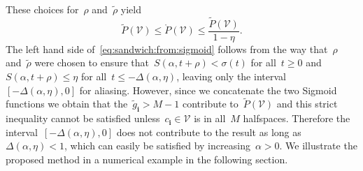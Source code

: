 \documentclass[letterpaper, 10pt, conference]{ieeeconf} %
\providecommand{\bfa}[1]{\mathbf{#1}}
\begin{document}
%
These choices for~$\rho$ and~$\tilde\rho$ yield
%
\begin{equation}\label{eq:sandwich:from:sigmoid}
	\tilde P(\mathcal V)\leq\mathring P(\mathcal V)\leq \frac{\tilde P(\mathcal V)}{1-\eta}.
\end{equation}
%
The left hand side of~\eqref{eq:sandwich:from:sigmoid} follows from the way that~$\rho$ and~$\tilde\rho$ were chosen to ensure that~$S(\alpha,t+\rho)<\sigma(t)$ for all~$t\geq0$ and~$S(\alpha,t+\rho)\leq\eta$ for all~$t\leq -\Delta(\alpha,\eta)$, leaving only the interval~$[-\Delta(\alpha,\eta),0]$ for aliasing.
%
However, since we concatenate the two Sigmoid functions we obtain that the~$\tilde g_\bfa{i}>M-1$ contribute to~$\tilde P(\mathcal V)$ and this strict inequality cannot be satisfied unless~$c_\bfa{i}\in\mathcal V$ is in all~$M$ halfspaces. Therefore the interval~$[-\Delta(\alpha,\eta),0]$ does not contribute to the result as long as~$\Delta(\alpha,\eta)<1$, which can easily be satisfied by increasing~$\alpha>0$.
%
We illustrate the proposed method in a numerical example in the following section.
\end{document}
